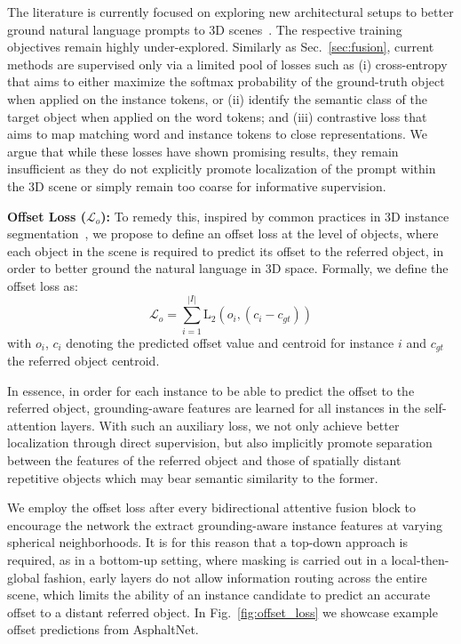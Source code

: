 \documentclass[10pt,twocolumn,letterpaper]{article}
\begin{document}
The literature is currently focused on exploring new architectural setups to better ground natural language prompts to 3D scenes~\cite{jain2022bottom, yang2021sat, zhao2021_3DVG_Transformer}. The respective training objectives remain highly under-explored. Similarly as Sec.~\ref{sec:fusion}, current methods are supervised only via a limited pool of losses such as (i) cross-entropy that aims to either maximize the softmax probability of the ground-truth object when applied on the instance tokens, or (ii) identify the semantic class of the target object when applied on the word tokens; and (iii) contrastive loss that aims to map matching word and instance tokens to close representations. We argue that while these losses have shown promising results, they remain insufficient as they do not explicitly promote localization of the prompt within the 3D scene or simply remain too coarse for informative supervision.

\vspace{5px}
\noindent\textbf{Offset Loss ($\mathcal{L}_o$):} To remedy this, inspired by common practices in 3D instance segmentation~\cite{ngo2023isbnet,wu20223d}, we propose to define an offset loss at the level of objects, where each object in the scene is required to predict its offset to the referred object, in order to better ground the natural language in 3D space. Formally, we define the offset loss as:
\begin{equation}
    \mathcal{L}_o = \sum_{i=1}^{|I|} \mathrm{L}_2(o_i, (c_i - c_{gt}))
\end{equation}
with $o_i$, $c_i$ denoting the predicted offset value and centroid for instance $i$ and $c_{gt}$ the referred object centroid.

In essence, in order for each instance to be able to predict the offset to the referred object, grounding-aware features are learned for all instances in the self-attention layers. With such an auxiliary loss, we not only achieve better localization through direct supervision, but also implicitly promote separation between the features of the referred object and those of spatially distant repetitive objects which may bear semantic similarity to the former.

We employ the offset loss after every bidirectional attentive fusion block to encourage the network the extract grounding-aware instance features at varying spherical neighborhoods. It is for this reason that a top-down approach is required, as in a bottom-up setting, where masking is carried out in a local-then-global fashion, early layers do not allow information routing across the entire scene, which limits the ability of an instance candidate to predict an accurate offset to a distant referred object. In Fig.~\ref{fig:offset_loss} we showcase example offset predictions from AsphaltNet.
\end{document}
